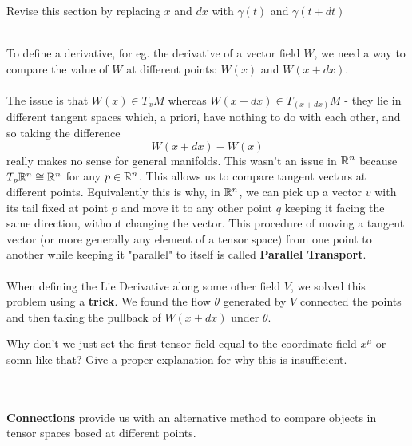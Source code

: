 \documentclass[11pt]{article}
\begin{document}
\begin{note}
  {Revise this section by replacing $x$ and $dx$ with $\gamma(t)$ and $\gamma(t+dt)$}
\end{note}
\\
To define a derivative, for eg. the derivative of a vector field $W$, we need a way to compare the value of $W$ at different points: $W(x)$ and $W(x + dx)$. 
\\
\\
The issue is that $W(x) \in T_x M$ whereas $W(x + dx) \in  T_{(x + dx)} M$ - they lie in different tangent spaces which, a priori, have nothing to do with each other, and so taking the difference 
\[ W(x + dx) - W(x) \]
really makes no sense for general manifolds. This wasn't an issue in $\mathbb{R}^n$ because $T_p \mathbb{R}^n \cong \mathbb{R}^n$ for any $p \in \mathbb{R}^n$. This allows us to compare tangent vectors at different points. Equivalently this is why, in $\mathbb{R}^n$, we can pick up a vector $v$ with its tail fixed at point $p$ and move it to any other point $q$ keeping it facing the same direction, without changing the vector. This procedure of moving a tangent vector (or more generally any element of a tensor space) from one point to another while keeping it "parallel" to itself is called \textbf{Parallel Transport}.
\\
\\
When defining the Lie Derivative along some other field $V$, we solved this problem using a \textbf{trick}. We found the flow $\theta$ generated by $V$ connected the points and then taking the pullback of $W(x + dx)$ under $\theta$. 
\begin{note}
  {Why don't we just set the first tensor field equal to the coordinate field $x^{\mu}$ or somn like that? Give a proper explanation for why this is insufficient.}
\end{note}
\\
\\
\textbf{Connections} provide us with an alternative method to compare objects in tensor spaces based at different points.
\end{document}
